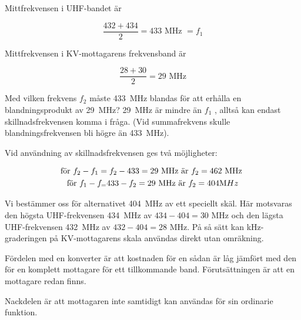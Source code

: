 Mittfrekvensen i UHF-bandet är

\[\frac{432+434}{2} = 433\text{ MHz } = f_1\]

Mittfrekvensen i KV-mottagarens frekvensband är

\[\frac{28 + 30}{2} = 29\text{ MHz}\]

Med vilken frekvens \(f_2\) måste 433~MHz blandas för att erhålla en
blandningsprodukt av 29~MHz? 29~MHz är mindre än \(f_1\) , alltså kan
endast skillnadsfrekvensen komma i fråga. (Vid summafrekvens skulle
blandningsfrekvensen bli högre än 433~MHz).

Vid användning av skillnadsfrekvensen ges två möjligheter:

\begin{gather*}
  \text{för }f_2 - f_1 = f_2 - 433 = 29\text{ MHz är }f_2 = 462\text{ MHz} \\
  \text{för }f_1 - f_ = 433 - f_2 = 29\text{ MHz är }f_2 = 404{\text MHz} \\
\end{gather*}

Vi bestämmer oss för alternativet 404~MHz av ett speciellt skäl. Här
motsvaras den högsta UHF-frekvensen 434~MHz av \(434 - 404 = 30\) MHz
och den lägsta UHF-frekvensen 432~MHz av \(432 - 404 = 28\) MHz. På så
sätt kan kHz-graderingen på KV-mottagarens skala användas direkt utan
omräkning.

Fördelen med en konverter är att kostnaden för en sådan är låg jämfört
med den för en komplett mottagare för ett tillkommande
band. Förutsättningen är att en mottagare redan finns.

Nackdelen är att mottagaren inte samtidigt kan användas för sin
ordinarie funktion.

